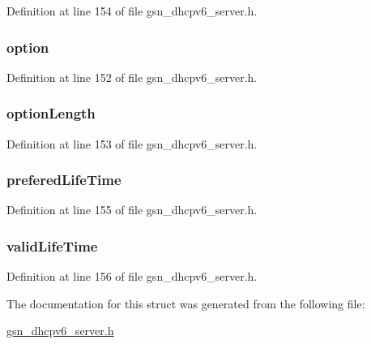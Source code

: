 Definition at line 154 of file gsn\_\-dhcpv6\_\-server.h.

\hypertarget{a00448_a4ea9b0ff2f7afc39a9ce6e27efea3c1a}{
\subsubsection[{option}]{ {\bf option}}}
\label{a00448_a4ea9b0ff2f7afc39a9ce6e27efea3c1a}


Definition at line 152 of file gsn\_\-dhcpv6\_\-server.h.

\hypertarget{a00448_a34af08bbd90310de2d99728fb4bc5aee}{
\subsubsection[{optionLength}]{ {\bf optionLength}}}
\label{a00448_a34af08bbd90310de2d99728fb4bc5aee}


Definition at line 153 of file gsn\_\-dhcpv6\_\-server.h.

\hypertarget{a00448_ae592c3c5c825fa4f8dd57962b1a75824}{
\subsubsection[{preferedLifeTime}]{ {\bf preferedLifeTime}}}
\label{a00448_ae592c3c5c825fa4f8dd57962b1a75824}


Definition at line 155 of file gsn\_\-dhcpv6\_\-server.h.

\hypertarget{a00448_aa87f9d507d75c14447e994bd1503d42b}{
\subsubsection[{validLifeTime}]{ {\bf validLifeTime}}}
\label{a00448_aa87f9d507d75c14447e994bd1503d42b}


Definition at line 156 of file gsn\_\-dhcpv6\_\-server.h.



The documentation for this struct was generated from the following file:\begin{DoxyCompactItemize}
\item 
\hyperlink{a00483}{gsn\_\-dhcpv6\_\-server.h}\end{DoxyCompactItemize}
